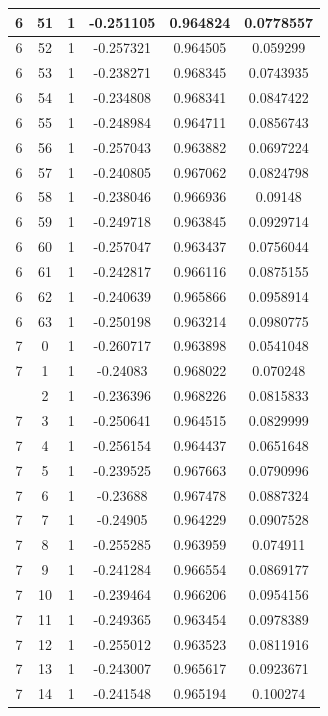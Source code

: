 \documentclass[12pt,a4paper]{article}
\numberwithin{equation}{section}
\numberwithin{figure}{section}
\numberwithin{table}{section}
\begin{document}
\begin{longtable}{|c|c|c|c|c|c|}
6 & 51 & 1 & -0.251105 & 0.964824 & 0.0778557 \\ \hline
6 & 52 & 1 & -0.257321 & 0.964505 & 0.059299 \\ \hline
6 & 53 & 1 & -0.238271 & 0.968345 & 0.0743935 \\ \hline
6 & 54 & 1 & -0.234808 & 0.968341 & 0.0847422 \\ \hline
6 & 55 & 1 & -0.248984 & 0.964711 & 0.0856743 \\ \hline
6 & 56 & 1 & -0.257043 & 0.963882 & 0.0697224 \\ \hline
6 & 57 & 1 & -0.240805 & 0.967062 & 0.0824798 \\ \hline
6 & 58 & 1 & -0.238046 & 0.966936 & 0.09148 \\ \hline
6 & 59 & 1 & -0.249718 & 0.963845 & 0.0929714 \\ \hline
6 & 60 & 1 & -0.257047 & 0.963437 & 0.0756044 \\ \hline
6 & 61 & 1 & -0.242817 & 0.966116 & 0.0875155 \\ \hline
6 & 62 & 1 & -0.240639 & 0.965866 & 0.0958914 \\ \hline
6 & 63 & 1 & -0.250198 & 0.963214 & 0.0980775 \\ \hline
7 & 0 & 1 & -0.260717 & 0.963898 & 0.0541048 \\ \hline
7 & 1 & 1 & -0.24083 & 0.968022 & 0.070248 \\ \hline
\pagebreak
7 & 2 & 1 & -0.236396 & 0.968226 & 0.0815833 \\ \hline
7 & 3 & 1 & -0.250641 & 0.964515 & 0.0829999 \\ \hline
7 & 4 & 1 & -0.256154 & 0.964437 & 0.0651648 \\ \hline
7 & 5 & 1 & -0.239525 & 0.967663 & 0.0790996 \\ \hline
7 & 6 & 1 & -0.23688 & 0.967478 & 0.0887324 \\ \hline
7 & 7 & 1 & -0.24905 & 0.964229 & 0.0907528 \\ \hline
7 & 8 & 1 & -0.255285 & 0.963959 & 0.074911 \\ \hline
7 & 9 & 1 & -0.241284 & 0.966554 & 0.0869177 \\ \hline
7 & 10 & 1 & -0.239464 & 0.966206 & 0.0954156 \\ \hline
7 & 11 & 1 & -0.249365 & 0.963454 & 0.0978389 \\ \hline
7 & 12 & 1 & -0.255012 & 0.963523 & 0.0811916 \\ \hline
7 & 13 & 1 & -0.243007 & 0.965617 & 0.0923671 \\ \hline
7 & 14 & 1 & -0.241548 & 0.965194 & 0.100274 \\ \hline

\end{longtable}
\end{document}
